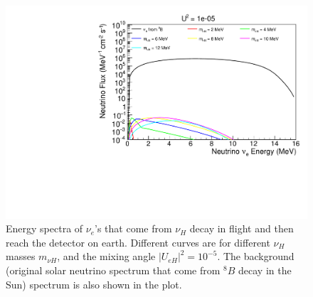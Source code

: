 \documentclass[%
 reprint,
 amsmath,amssymb,
 aps,
 prd,
floatfix,
twocolumn,
]{revtex4-1}
\begin{document}
\begin{figure}[!htbp]
\includegraphics[width=0.99\columnwidth]{../plots/DecayInFlightNuLEnergy_U1e-05_AllMass_linXlogY.pdf}
\caption{Energy spectra of $\nu_e$'s that come from $\nu_H$ decay in flight and then reach the detector on earth. Different curves are for different $\nu_H$ masses $m_{\nu H}$, and the mixing angle $|U_{eH}|^2 = 10^{-5}$. 
The background (original solar neutrino spectrum that come from $^8 B$ decay in the Sun) spectrum is also shown in the plot.}
\label{fig:DecayInFlightSpectrum_U1em5_AllMass}
\end{figure}





\clearpage


\end{document}
